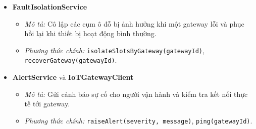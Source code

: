 \begin{itemize}[leftmargin=1.5cm]
    \item \textbf{FaultIsolationService}
    \begin{itemize}
        \item \textit{Mô tả:} Cô lập các cụm ô đỗ bị ảnh hưởng khi một gateway lỗi và phục hồi lại khi thiết bị hoạt động bình thường.
        \item \textit{Phương thức chính:} \texttt{isolateSlotsByGateway(gatewayId)}, \texttt{recoverGateway(gatewayId)}.
    \end{itemize}

    \item \textbf{AlertService} và \textbf{IoTGatewayClient}
    \begin{itemize}
        \item \textit{Mô tả:} Gửi cảnh báo sự cố cho người vận hành và kiểm tra kết nối thực tế tới gateway.
        \item \textit{Phương thức chính:} \texttt{raiseAlert(severity, message)}, \texttt{ping(gatewayId)}.
    \end{itemize}
\end{itemize}

